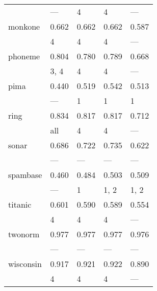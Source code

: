 \begin{tabular}{lllll}
                  & ---   & 4     & 4     & ---   \\
 monkone          & 0.662 & 0.662 & 0.662 & 0.587 \\
                  & 4     & 4     & 4     & ---   \\
 phoneme          & 0.804 & 0.780 & 0.789 & 0.668 \\
                  & 3, 4  & 4     & 4     & ---   \\
 pima             & 0.440 & 0.519 & 0.542 & 0.513 \\
                  & ---   & 1     & 1     & 1     \\
 ring             & 0.834 & 0.817 & 0.817 & 0.712 \\
                  & all   & 4     & 4     & ---   \\
 sonar            & 0.686 & 0.722 & 0.735 & 0.622 \\
                  & ---   & ---   & ---   & ---   \\
 spambase         & 0.460 & 0.484 & 0.503 & 0.509 \\
                  & ---   & 1     & 1, 2  & 1, 2  \\
 titanic          & 0.601 & 0.590 & 0.589 & 0.554 \\
                  & 4     & 4     & 4     & ---   \\
 twonorm          & 0.977 & 0.977 & 0.977 & 0.976 \\
                  & ---   & ---   & ---   & ---   \\
 wisconsin        & 0.917 & 0.921 & 0.922 & 0.890 \\
                  & 4     & 4     & 4     & ---   \\
\bottomrule
\end{tabular}
